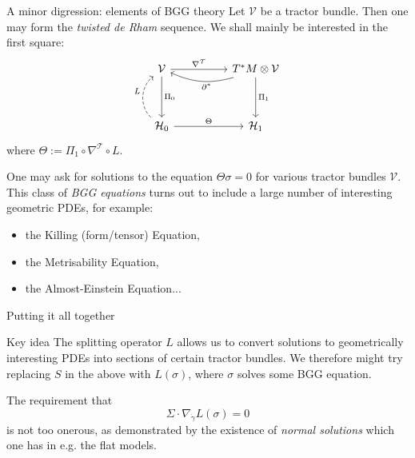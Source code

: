\documentclass[handout]{beamer}
\begin{document}
\begin{frame}{A minor digression: elements of BGG theory}
  Let \( \mathcal{V} \) be a tractor bundle.
  Then one may form the \emph{twisted de Rham} sequence.
  We shall mainly be interested in the first square:
  \pause
  \[
    \begin{tikzcd}[ampersand replacement=\&, row sep=huge, column sep=huge]
      \mathcal{V} \arrow[r, "\nabla^{\mathcal{T}}"] \arrow[d, "\Pi_0"] \& T^*M \otimes \mathcal{V} \arrow[l, "\hspace{-2em}\partial^*", near start, bend left=20] \arrow[d, "\Pi_1"]\\
      \mathcal{H}_0 \arrow[r, "\Theta"] \arrow[u, dashed, "L", bend left=50] \& \mathcal{H}_1
    \end{tikzcd}
  \]
  where \( \Theta := \Pi_1 \circ \nabla^{\mathcal{T}} \circ L \).
  \pause
  \begin{block}{}
  One may ask for solutions to the equation \( \Theta \sigma = 0 \) for various tractor bundles \( \mathcal{V} \).
  This class of \emph{BGG equations} turns out to include a large number of interesting geometric PDEs, for example: 
  \begin{itemize}
    \item the Killing (form/tensor) Equation, 
    \item the Metrisability Equation,
    \item the Almost-Einstein Equation...
  \end{itemize}
  \end{block}
\end{frame}

\begin{frame}{Putting it all together}
  \hspace{1em}
  \begin{block}{Key idea}
    The splitting operator \( L \) allows us to convert solutions to geometrically interesting PDEs into sections of certain tractor bundles.
    We therefore might try replacing \( S \) in the above with \( L(\sigma) \), where \( \sigma \) solves some BGG equation.
  \end{block}
  \hspace{1em}
  \pause

  The requirement that 
    \[
      \Sigma \cdot \nabla_{\dot{\gamma}} L(\sigma) = 0
    \]
    is not too onerous, as demonstrated by the existence of \emph{normal solutions} which one has in e.g. the flat models.
\end{frame}
\end{document}
